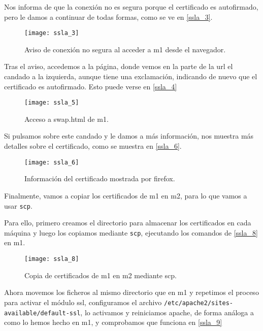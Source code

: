 Nos informa de que la conexión no es segura porque el certificado es autofirmado, pero le damos a continuar de todas formas, como se ve en \eqref{ssla_3}.

\begin{figure}[h!]
\begin{center}
\caption{Aviso de conexión no segura al acceder a m1 desde el navegador.}
\label{ssla_3}
\texttt{[image: ssla\_3]}
\end{center}
\end{figure}

Tras el aviso, accedemos a la página, donde vemos en la parte de la url el candado a la izquierda, aunque tiene una exclamación, indicando de nuevo que el certificado es autofirmado. Esto puede verse en \eqref{ssla_4}

\begin{figure}[h!]
\begin{center}
\caption{Acceso a swap.html de m1.}
\label{ssla_4}
\texttt{[image: ssla\_5]}
\end{center}
\end{figure}

Si pulsamos sobre este candado y le damos a más información, nos muestra más detalles sobre el certificado, como se muestra en \eqref{ssla_6}.

\begin{figure}[h!]
\begin{center}
\caption{Información del certificado mostrada por firefox.}
\label{ssla_6}
\texttt{[image: ssla\_6]}
\end{center}
\end{figure}

Finalmente, vamos a copiar los certificados de m1 en m2, para lo que vamos a usar \verb|scp|.

Para ello, primero creamos el directorio para almacenar los certificados en cada máquina y luego los copiamos mediante \verb|scp|, ejecutando los comandos de \eqref{ssla_8} en m1.

\begin{figure}[h!]
\begin{center}
\caption{Copia de certificados de m1 en m2 mediante scp.}
\label{ssla_8}
\texttt{[image: ssla\_8]}
\end{center}
\end{figure}

Ahora movemos los ficheros al mismo directorio que en m1 y repetimos el proceso para activar el módulo ssl, configuramos el archivo \verb|/etc/apache2/sites-available/default-ssl|, lo activamos y reiniciamos apache, de forma análoga a como lo hemos hecho en m1, y comprobamos que funciona en \eqref{ssla_9}

